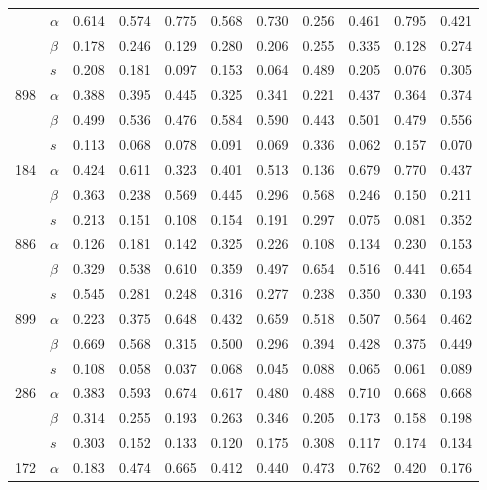 \begin{longtable}{llrrrrrrrrr}
\bottomrule
\endlastfoot
\multirow{3}{*}{491} & $\alpha$ & 0.614 & 0.574 & 0.775 & 0.568 & 0.730 & 0.256 & 0.461 & 0.795 & 0.421 \\
     & $\beta$ & 0.178 & 0.246 & 0.129 & 0.280 & 0.206 & 0.255 & 0.335 & 0.128 & 0.274 \\
     & $s$ & 0.208 & 0.181 & 0.097 & 0.153 & 0.064 & 0.489 & 0.205 & 0.076 & 0.305 \\
\cline{1-11}
\multirow{3}{*}{898} & $\alpha$ & 0.388 & 0.395 & 0.445 & 0.325 & 0.341 & 0.221 & 0.437 & 0.364 & 0.374 \\
     & $\beta$ & 0.499 & 0.536 & 0.476 & 0.584 & 0.590 & 0.443 & 0.501 & 0.479 & 0.556 \\
     & $s$ & 0.113 & 0.068 & 0.078 & 0.091 & 0.069 & 0.336 & 0.062 & 0.157 & 0.070 \\
\cline{1-11}
\multirow{3}{*}{184} & $\alpha$ & 0.424 & 0.611 & 0.323 & 0.401 & 0.513 & 0.136 & 0.679 & 0.770 & 0.437 \\
     & $\beta$ & 0.363 & 0.238 & 0.569 & 0.445 & 0.296 & 0.568 & 0.246 & 0.150 & 0.211 \\
     & $s$ & 0.213 & 0.151 & 0.108 & 0.154 & 0.191 & 0.297 & 0.075 & 0.081 & 0.352 \\
\cline{1-11}
\multirow{3}{*}{886} & $\alpha$ & 0.126 & 0.181 & 0.142 & 0.325 & 0.226 & 0.108 & 0.134 & 0.230 & 0.153 \\
     & $\beta$ & 0.329 & 0.538 & 0.610 & 0.359 & 0.497 & 0.654 & 0.516 & 0.441 & 0.654 \\
     & $s$ & 0.545 & 0.281 & 0.248 & 0.316 & 0.277 & 0.238 & 0.350 & 0.330 & 0.193 \\
\cline{1-11}
\multirow{3}{*}{899} & $\alpha$ & 0.223 & 0.375 & 0.648 & 0.432 & 0.659 & 0.518 & 0.507 & 0.564 & 0.462 \\
     & $\beta$ & 0.669 & 0.568 & 0.315 & 0.500 & 0.296 & 0.394 & 0.428 & 0.375 & 0.449 \\
     & $s$ & 0.108 & 0.058 & 0.037 & 0.068 & 0.045 & 0.088 & 0.065 & 0.061 & 0.089 \\
\cline{1-11}
\multirow{3}{*}{286} & $\alpha$ & 0.383 & 0.593 & 0.674 & 0.617 & 0.480 & 0.488 & 0.710 & 0.668 & 0.668 \\
     & $\beta$ & 0.314 & 0.255 & 0.193 & 0.263 & 0.346 & 0.205 & 0.173 & 0.158 & 0.198 \\
     & $s$ & 0.303 & 0.152 & 0.133 & 0.120 & 0.175 & 0.308 & 0.117 & 0.174 & 0.134 \\
\cline{1-11}
\multirow{3}{*}{172} & $\alpha$ & 0.183 & 0.474 & 0.665 & 0.412 & 0.440 & 0.473 & 0.762 & 0.420 & 0.176 \\

\end{longtable}
